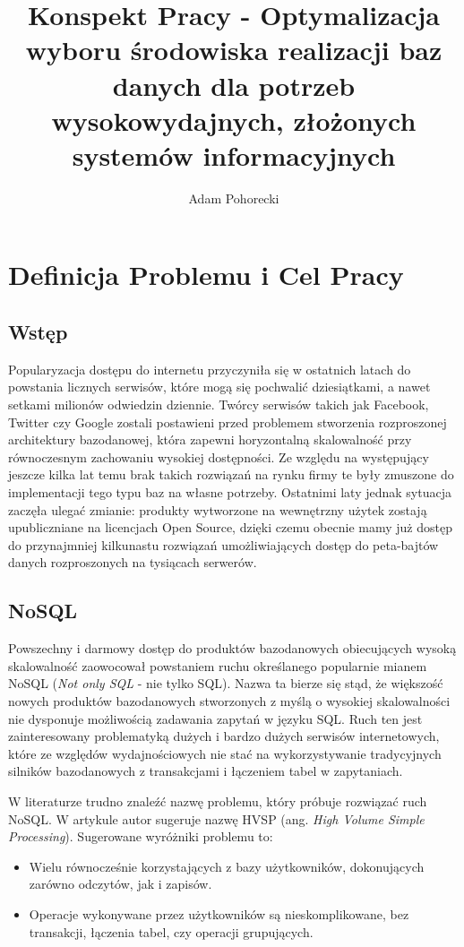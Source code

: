 \documentclass[a4paper,11pt]{article}
\title{Konspekt Pracy - Optymalizacja
wyboru środowiska realizacji baz danych dla potrzeb wysokowydajnych,
złożonych systemów informacyjnych}
\author{Adam Pohorecki}
\begin{document}


\maketitle

\section{Definicja Problemu i Cel Pracy}

\subsection*{Wstęp}

Popularyzacja dostępu do internetu przyczyniła się w ostatnich latach do 
powstania licznych serwisów, które mogą się pochwalić dziesiątkami, a nawet
setkami milionów odwiedzin dziennie. Twórcy serwisów takich jak Facebook,
Twitter czy Google zostali postawieni przed problemem stworzenia rozproszonej
architektury bazodanowej, która zapewni horyzontalną skalowalność przy
równoczesnym zachowaniu wysokiej dostępności. Ze względu na występujący jeszcze
kilka lat temu brak takich rozwiązań na rynku firmy te były zmuszone do
implementacji tego typu baz na własne potrzeby. Ostatnimi laty jednak sytuacja
zaczęła ulegać zmianie: produkty wytworzone na wewnętrzny użytek zostają
upubliczniane na licencjach Open Source, dzięki czemu obecnie mamy już dostęp do
przynajmniej kilkunastu rozwiązań umożliwiających dostęp do peta-bajtów danych
rozproszonych na tysiącach serwerów.

\subsection*{NoSQL}

Powszechny i darmowy dostęp do produktów bazodanowych obiecujących wysoką
skalowalność zaowocował powstaniem ruchu określanego popularnie mianem NoSQL
(\emph{Not only SQL} - nie tylko SQL). Nazwa ta bierze się stąd, że
większość nowych produktów bazodanowych stworzonych z myślą o wysokiej
skalowalności nie dysponuje możliwością zadawania zapytań w języku SQL. Ruch ten
jest zainteresowany problematyką dużych i bardzo dużych serwisów internetowych,
które ze względów wydajnościowych nie stać na wykorzystywanie tradycyjnych
silników bazodanowych z transakcjami i łączeniem tabel w zapytaniach.

W literaturze trudno znaleźć nazwę problemu, który próbuje rozwiązać ruch
NoSQL. W artykule \cite{monash-db-hvsp} autor sugeruje nazwę HVSP (ang.
\emph{High Volume Simple Processing}). Sugerowane wyróżniki problemu to:
\begin{itemize}
 \item Wielu równocześnie korzystających z bazy użytkowników, dokonujących
zarówno odczytów, jak i zapisów.
 \item Operacje wykonywane przez użytkowników są nieskomplikowane, bez
transakcji, łączenia tabel, czy operacji grupujących.
\end{itemize}
\end{document}
